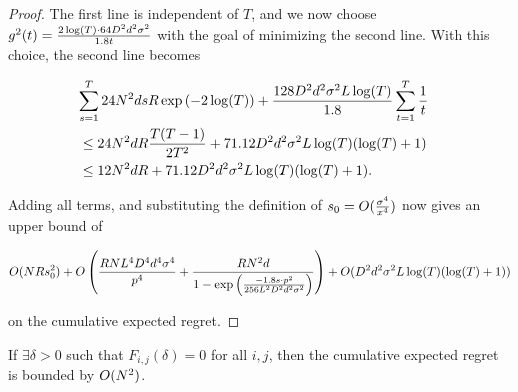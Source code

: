 \begin{proof}
The first line is independent of $T$, and we now choose
$g^2(t) = \frac{2\log(T) \cdot 64 D^2 d^2 \sigma^2}{1.8 t}$
with the goal of minimizing the second line.
With this choice, the second line becomes

\begin{align*}
\lefteqn{\sum_{s=1}^{T} 24\ARMNUM^2 d s \MAXR \exp\left(-2\log(T)\right)  +
          \frac{128\Diam^2 d^2\sigma^2
          \TieDensity\log(T)}{1.8}\sum_{t=1}^{T}\frac{1}{t}}
\\ & \leq
24\ARMNUM^2 d R\frac{T(T-1)}{2T^2}  + 71.12 \Diam^2 d^2\sigma^2
          \TieDensity\log(T)(\log(T)+1)
  \\ & \leq
12 \ARMNUM^2 d R  + 71.12 \Diam^2 d^2\sigma^2 \TieDensity\log(T)(\log(T)+1). 
\end{align*}

Adding all terms, and substituting the definition of
$s_0 = O(\frac{\sigma^4}{x^4})$
now gives an upper bound of 

\begin{multline*}
O(N R s_0^2) + 
O \left( \frac{R N L^4 D^4 d^4 \sigma^4}{p^4}
  + \frac{R N^2 d}{1 - \exp \left(
    \frac{-1.8 s \cdot p^2}{256 L^2 D^2 d^2 \sigma^2}
  \right)} \right) +
O(D^2 d^2\sigma^2 L\log(T)(\log(T)+1)) 
\end{multline*}

on the cumulative expected regret.
\end{proof}


\begin{corollary} \label{cor:constant-regret}
If $\exists \delta>0$ such that $F_{i,j}(\delta)=0$ for all $i,j$, then the cumulative expected regret is bounded by $O(N^2)$.
\end{corollary}

